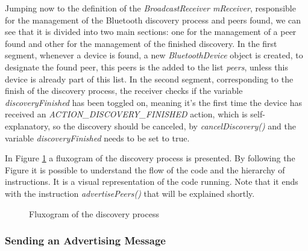 Jumping now to the definition of the \textit{BroadcastReceiver mReceiver}, responsible for the management of the Bluetooth discovery process and peers found, we can see that it is divided into two main sections: one for the management of a peer found and other for the management of the finished discovery. In the first segment, whenever a device is found, a new \textit{BluetoothDevice} object is created, to designate the found peer, this peers is the added to the list \textit{peers}, unless this device is already part of this list. In the second segment, corresponding to the finish of the discovery process, the receiver checks if the variable \textit{discoveryFinished} has been toggled on, meaning it's the first time the device has received an \textit{ACTION\_DISCOVERY\_FINISHED} action, which is self-explanatory, so the discovery should be canceled, by \textit{cancelDiscovery()} and the variable \textit{discoveryFinished} needs to be set to true.

In Figure \ref{fig:discflux} a fluxogram of the discovery process is presented. By following the Figure it is possible to understand the flow of the code and the hierarchy of instructions. It is a visual representation of the code running. Note that it ends with the instruction \textit{advertisePeers()} that will be explained shortly.

\begin{figure}[ht]
   \noindent{}
	\caption{\label{fig:discflux} Fluxogram of the discovery process}
\end{figure}

\subsubsection{Sending an Advertising Message}
\label{subsubsec:sendadv}


